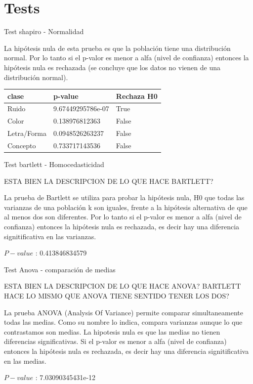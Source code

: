 \documentclass{beamer}
\begin{document}
\section{Tests}

\begin{frame}{Test shapiro - Normalidad}

La hipótesis nula de esta prueba es que la población tiene una distribución normal. Por lo tanto si el p-valor es menor a alfa (nivel de confianza) entonces la hipótesis nula es rechazada (se concluye que los datos no vienen de una distribución normal).

\begin{center}
    \begin{tabular}{ | p{2cm} | p{3.5cm} | p{2cm} |}
    \hline
     clase       &  p-value               & Rechaza H0		\\ 
    \hline
     Ruido       &  9.67449295786e-07     & True 				\\ 
     Color       &  0.138976812363   	  &	False				\\ 
     Letra/Forma &  0.0948526263237       & False 				\\ 
	 Concepto    &  0.733717143536   	  &	False			\\ 
    \hline
    \end{tabular}
\end{center} 

\end{frame}

\begin{frame}{Test bartlett - Homocedasticidad}

{\Large ESTA BIEN LA DESCRIPCION DE LO QUE HACE BARTLETT?}

La prueba de Bartlett se utiliza para probar la hipótesis nula, H0 que todas las varianzas de una población k son iguales, frente a la hipótesis alternativa de que al menos dos son diferentes.
Por lo tanto si el p-valor es menor a alfa (nivel de confianza) entonces la hipótesis nula es rechazada, es decir hay una diferencia signitificativa en las varianzas.

$P-value$ : 0.413846834579

\end{frame}

\begin{frame}{Test Anova - comparación de medias}

{\Large ESTA BIEN LA DESCRIPCION DE LO QUE HACE ANOVA?}
{\Large BARTLETT HACE LO MISMO QUE ANOVA TIENE SENTIDO TENER LOS DOS?}

La prueba ANOVA (Analysis Of Variance) permite comparar simultaneamente todas las medias. Como su nombre lo indica, compara varianzas aunque lo que contrastamos son medias. La hipotesis nula es que las medias no tienen diferencias significativas.
Si el p-valor es menor a alfa (nivel de confianza) entonces la hipótesis nula es rechazada, es decir hay una diferencia signitificativa en las medias.

$P-value$ : 7.03090345431e-12

\end{frame}
\end{document}
